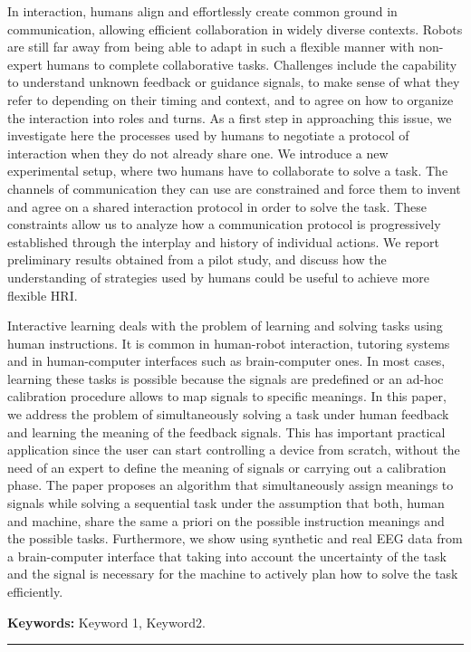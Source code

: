 \begin{vcenterpage}
In interaction, humans align and effortlessly create common ground in communication, allowing efficient collaboration in widely diverse contexts.
Robots are still far away from being able to adapt in such a flexible manner with non-expert humans to complete collaborative tasks. Challenges include the capability to understand unknown feedback or guidance signals, to make sense of what they refer to depending on their timing and context, and to agree on how to organize the interaction into roles and turns. 
As a first step in approaching this issue, we investigate here the processes used by humans to negotiate a protocol of interaction when they do not already share one.
We introduce a new experimental setup, where two humans have to collaborate to solve a task. The channels of communication they can use are constrained and force them to invent and agree on a shared interaction protocol in order to solve the task. These constraints allow us to analyze how a communication protocol is progressively established through the interplay and history of individual actions. We report preliminary results obtained from a pilot study, and discuss how the understanding of strategies used by humans could be useful to achieve more flexible HRI.

Interactive learning deals with the problem of learning and solving tasks using human instructions. It is common in human-robot interaction, tutoring systems and in human-computer interfaces such as brain-computer ones. In most cases, learning these tasks is possible because the signals are predefined or an ad-hoc calibration procedure allows to map signals to specific meanings. In this paper, we address the problem of simultaneously solving a task under human feedback and learning the meaning of the feedback signals. 
This has important practical application since the user can start controlling a device from scratch, without the need of an expert to define the meaning of signals or carrying out a calibration phase. The paper proposes an algorithm that simultaneously assign meanings to signals while solving a sequential task under the assumption that both, human and machine, share the same a priori on the possible instruction meanings and the possible tasks. Furthermore, we show using synthetic and real EEG data from a brain-computer interface that taking into account the uncertainty of the task and the signal is necessary for the machine to actively plan how to solve the task efficiently. 

{\large\textbf{Keywords:}}
Keyword 1, Keyword2.\\

\noindent\rule[2pt]{\textwidth}{0.5pt}
\end{vcenterpage}